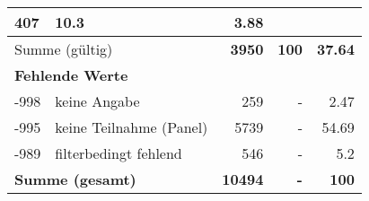 \begin{longtable}{lXrrr}
       \num{407} &
       \num[round-mode=places,round-precision=2]{10,3} &
         \num[round-mode=places,round-precision=2]{3,88} \\
     \midrule
     \multicolumn{2}{l}{Summe (gültig)} &
       \textbf{\num{3950}} &
     \textbf{100} &
       \textbf{\num[round-mode=places,round-precision=2]{37,64}} \\
     \multicolumn{5}{l}{\textbf{Fehlende Werte}}\\
       -998 &
       keine Angabe &
         \num{259} &
        - &
         \num[round-mode=places,round-precision=2]{2,47} \\
       -995 &
       keine Teilnahme (Panel) &
         \num{5739} &
        - &
         \num[round-mode=places,round-precision=2]{54,69} \\
       -989 &
       filterbedingt fehlend &
         \num{546} &
        - &
         \num[round-mode=places,round-precision=2]{5,2} \\
     \midrule
     \multicolumn{2}{l}{\textbf{Summe (gesamt)}} &
          \textbf{\num{10494}} &
        \textbf{-} &
        \textbf{100} \\
     \bottomrule
     \end{longtable}
     
